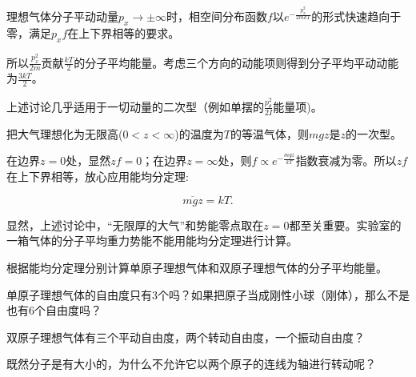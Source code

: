 \documentclass[CJK]{beamer}
\begin{document}
\begin{frame}
\bch
{\large
理想气体分子平动动量$p_x\rightarrow \pm \infty$时，相空间分布函数$f$以$e^{-\frac{p_x^2}{2mkT}}$的形式快速趋向于零，满足$p_xf$在上下界相等的要求。

\skipline

所以$\frac{p_x^2}{2m}$贡献$\frac{kT}{2}$的分子平均能量。考虑三个方向的动能项则得到分子平均平动动能为$\frac{3kT}{2}$。

\skipline

上述讨论几乎适用于一切动量的二次型（例如单摆的$\frac{p^2_\theta}{2I}$能量项)。

}
\ech
\end{frame}


\begin{frame}
\bch
    {\large
      把大气理想化为无限高($0<z<\infty$)的温度为$T$的等温气体，则$mgz$是$z$的一次型。

      在边界$z=0$处，显然$zf = 0$；在边界$z=\infty$处，则$f\propto e^{-\frac{mgz}{kT}} $指数衰减为零。所以$zf$在上下界相等，放心应用能均分定理:

      $$\overline{mgz} = kT.$$

      显然，上述讨论中，“无限厚的大气”和势能零点取在$z=0$都至关重要。实验室的一箱气体的分子平均重力势能不能用能均分定理进行计算。
}
\ech
\end{frame}


\begin{frame}
\bch
{}
{\large
 根据能均分定理分别计算单原子理想气体和双原子理想气体的分子平均能量。        
}
\ech
\end{frame}


\begin{frame}
\bch
单原子理想气体的自由度只有3个吗？如果把原子当成刚性小球（刚体），那么不是也有6个自由度吗？



\ech
\end{frame}


\begin{frame}
\bch
双原子理想气体有三个平动自由度，两个转动自由度，一个振动自由度？

既然分子是有大小的，为什么不允许它以两个原子的连线为轴进行转动呢？



\ech
\end{frame}
\end{document}

